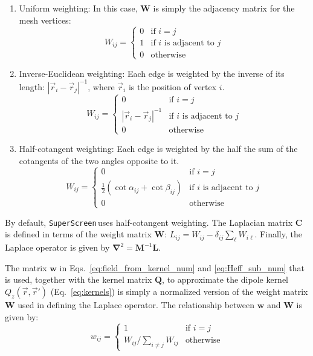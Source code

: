\documentclass[preprint,12pt]{elsarticle}
\newcounter{bla}
\newcommand{\SuperScreen}{\texttt{SuperScreen}\,}
\begin{document}
\begin{enumerate}
    \item{
        Uniform weighting: In this case, $\mathbf{W}$ is simply the adjacency matrix for the mesh vertices:
        $$
            W_{ij} =
            \begin{cases}
                0&\text{if }i=j\\
                1&\text{if }i\text{ is adjacent to }j\\
                0&\text{otherwise}
            \end{cases}
        $$
    }
    \item{
        Inverse-Euclidean weighting: Each edge is weighted by the inverse of its length: $|\vec{r}_i-\vec{r}_j|^{-1}$, where $\vec{r}_i$ is the position of vertex $i$.
        $$
            W_{ij} =
            \begin{cases}
                0&\text{if }i=j\\
                |\vec{r}_i-\vec{r}_j|^{-1}&\text{if }i\text{ is adjacent to }j\\
                0&\text{otherwise}
            \end{cases}
        $$
    }
    \item{
        Half-cotangent weighting: Each edge is weighted by the half the sum of the cotangents of the two angles opposite to it.
        $$
            W_{ij} =
            \begin{cases}
                0&\text{if }i=j\\
                \frac{1}{2}\left(\cot\alpha_{ij}+\cot\beta_{ij}\right)&\text{if }i\text{ is adjacent to }j\\
                0&\text{otherwise}
            \end{cases}
        $$
    }
\end{enumerate}

By default, \SuperScreen uses half-cotangent weighting. The Laplacian matrix $\mathbf{C}$ is defined in terms of the weight matrix $\mathbf{W}$: $L_{ij} = W_{ij} - \delta_{ij}\sum_{\ell}W_{i\ell}$. Finally, the Laplace operator is given by $\mathbf{\nabla}^2 = \mathbf{M}^{-1}\mathbf{L}$.

The matrix $\mathbf{w}$ in Eqs.~\ref{eq:field_from_kernel_num} and \ref{eq:Heff_sub_num} that is used, together with the kernel matrix $\mathbf{Q}$, to approximate the dipole kernel $Q_z(\vec{r},\vec{r}')$ (Eq.~\ref{eq:kernels}) is simply a normalized version of the weight matrix $\mathbf{W}$ used in defining the Laplace operator. The relationship between $\mathbf{w}$ and $\mathbf{W}$ is given by:
$$
    w_{ij} = \begin{cases}
        1&\text{if }i = j\\
        W_{ij} / \sum_{i\neq j} W_{ij}&\text{otherwise}
    \end{cases}
$$
\end{document}
